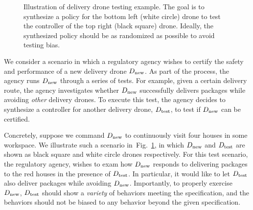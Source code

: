 
\begin{figure}
  \centering {}
  \caption{ Illustration of delivery drone testing example. The goal
    is to synthesize a policy for the bottom left (white circle) drone
    to test the controller of the top right (black square) drone. Ideally,
    the synthesized policy should be as randomized as possible to avoid
    testing bias.\label{fig:motivating} }
\end{figure}

We consider a scenario in which a regulatory agency
wishes to certify the safety and performance of a new delivery drone ${D_{\text{new}}}$.
As part of the process, the agency runs ${D_{\text{new}}}$ through a series of tests. For example, given a certain
delivery route, the agency investigates whether ${D_{\text{new}}}$ successfully delivers packages while
avoiding \emph{other} delivery drones. To execute this test, the agency decides to
synthesize a controller for another delivery drone, ${D_{\text{test}}}$, to test if
${D_{\text{new}}}$ can be certified.

Concretely,
suppose we command
${D_{\text{new}}}$ to continuously visit four houses in some workspace. We
illustrate such a scenario in~Fig.~\ref{fig:motivating}, in which
${D_{\text{new}}}$ and ${D_{\text{test}}}$ are shown as black square and white circle
drones respectively.  For this test scenario, the regulatory agency,
wishes to exam how ${D_{\text{new}}}$ responds to delivering packages to the
red houses in the presence of ${D_{\text{test}}}$. In particular, it would like to let ${D_{\text{test}}}$ also deliver packages while avoiding
${D_{\text{new}}}$. Importantly,
to properly exercise ${D_{\text{new}}}$, ${D_{\text{test}}}$ should show a \emph{variety} of behaviors meeting  the specification, and the behaviors should not be biased to any behavior beyond the given specification.

